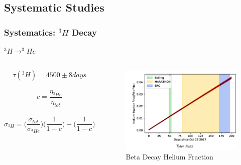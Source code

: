 \documentclass{beamer}
\begin{document}
\subsection[Systematic Studies]{Systematic Studies}
\begin{frame}
\frametitle{Systematics: $^3H $ Decay}
	\begin{block}{$^3H \rightarrow ^3He$}
		\begin{columns}
			\begin{equation*}
			 	\tau(^3H) = 4500 \pm 8 days
			 \end{equation*}		 	
			 \\
			 \begin{equation*}
			 	c = \frac{\eta_{^3He}} {\eta_{tot}}
			 \end{equation*}
			 \\
 			 \begin{equation*}
				 \sigma_{^3H} = \big(\frac{\sigma_{tot}}{\sigma_{^3He}}\big) \big(\frac{1}{1-c}\big) -  \big(\frac{1}{1-c}\big)  
			 \end{equation*}
		 	\begin{figure}
		 		\caption*{Beta Decay Helium Fraction}
			 	\includegraphics[width=6cm]{../images/beta_decay.png}
			 \end{figure}
		\end{columns}
	\end{block}
\end{frame}
\end{document}
